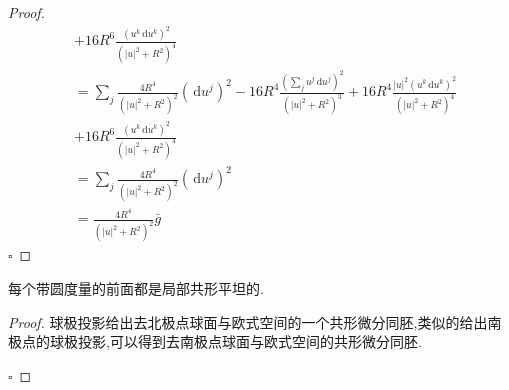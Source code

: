 \documentclass[../../几何与拓扑.tex]{subfiles}
\begin{document}
\begin{proof}
\[\begin{aligned}
      & + 16R^{6} \frac{\left( u^{k}\,\mathrm{d} u^{k} \right)^{2}   }{ \left( \left| u \right|^{2}+ R^{2}  \right)^{4} }\\ 
       & =   \sum _{j}\frac{4R^{4} }{\left( \left| u \right|^{2}+ R^{2}  \right)^{2}  }\left( \,\mathrm{d} u^{j} \right)^{2} -16R^{4} \frac{\left( \sum _{j}u^{j}\,\mathrm{d} u^{j} \right)^{2}  }{\left( \left| u \right|^{2}+ R^{2}  \right)^{3}  }  + 16R^{4} \frac{\left| u \right|^{2}\left( u^{k}\,\mathrm{d} u^{k} \right)^{2}   }{\left( \left| u \right|^{2}+ R^{2}  \right)^{4}  }\\ 
        & + 16R^{6} \frac{\left( u^{k}\,\mathrm{d} u^{k} \right)^{2}  }{\left( \left| u \right|^{2}+ R^{2}  \right)^{4}  }  \\ 
         & = \sum _{j} \frac{4R^{4} }{\left( \left| u \right|^{2}+ R^{2}  \right)^{2}  }\left( \,\mathrm{d} u^{j} \right)^{2}\\ 
          & =  \frac{4R^{4} }{\left( \left| u \right|^{2}+ R^{2}  \right)^{2}  } \bar{g} 
     \end{aligned}
     \]
    \hfill $\square$
\end{proof}

\begin{corollary}
    每个带圆度量的前面都是局部共形平坦的.
\end{corollary}

\begin{proof}
    球极投影给出去北极点球面与欧式空间的一个共形微分同胚,类似的给出南极点的球极投影,可以得到去南极点球面与欧式空间的共形微分同胚.

    \hfill $\square$
\end{proof}
\end{document}
